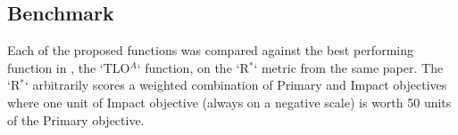 \subsection{Benchmark}



Each of the proposed functions was compared against the best performing function in \cite{vamplew_potential-based_2021}, the `TLO$^A$` function, on the `R$^*$` metric from the same paper. The `R$^*$` arbitrarily scores a weighted combination of Primary and Impact objectives where one unit of Impact objective (always on a negative scale) is worth 50 units of the Primary objective.


